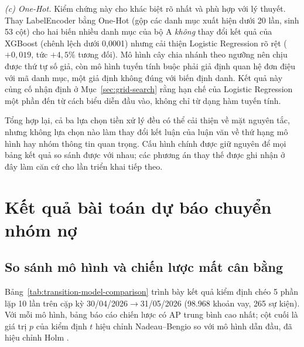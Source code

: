 \noindent\textit{(c) One-Hot.} Kiểm chứng này cho khác biệt rõ nhất và phù hợp với lý thuyết. Thay LabelEncoder bằng One-Hot (gộp các danh mục xuất hiện dưới 20 lần, sinh 53 cột) cho hai biến nhiều danh mục của bộ A \emph{không} thay đổi kết quả của XGBoost (chênh lệch dưới 0,0001) nhưng cải thiện Logistic Regression rõ rệt ($+0,019$, tức $+4,5\%$ tương đối). Mô hình cây chia nhánh theo ngưỡng nên chịu được thứ tự số giả, còn mô hình tuyến tính buộc phải giả định quan hệ đơn điệu với mã danh mục, một giả định không đúng với biến định danh. Kết quả này củng cố nhận định ở Mục~\ref{sec:grid-search} rằng hạn chế của Logistic Regression một phần đến từ cách biểu diễn đầu vào, không chỉ từ dạng hàm tuyến tính.

Tổng hợp lại, cả ba lựa chọn tiền xử lý đều có thể cải thiện về mặt nguyên tắc, nhưng không lựa chọn nào làm thay đổi kết luận của luận văn về thứ hạng mô hình hay nhóm thông tin quan trọng. Cấu hình chính được giữ nguyên để mọi bảng kết quả so sánh được với nhau; các phương án thay thế được ghi nhận ở đây làm căn cứ cho lần triển khai tiếp theo.

\section{Kết quả bài toán dự báo chuyển nhóm nợ}
\label{sec:transition-results}

\subsection{So sánh mô hình và chiến lược mất cân bằng}
\label{sec:transition-model-cmp}

Bảng~\ref{tab:transition-model-comparison} trình bày kết quả kiểm định chéo 5 phần lặp 10 lần trên cặp kỳ 30/04/2026$\to$31/05/2026 (98.968 khoản vay, 265 sự kiện). Với mỗi mô hình, bảng báo cáo chiến lược có AP trung bình cao nhất; cột cuối là giá trị $p$ của kiểm định $t$ hiệu chỉnh Nadeau--Bengio so với mô hình dẫn đầu, đã hiệu chỉnh Holm \cite{nadeau2003inference}.

